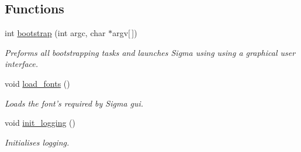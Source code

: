 \subsection*{Functions}
\begin{DoxyCompactItemize}
\item 
\hypertarget{namespacesigma_1_1gui_af29d2039a3ce3982f2f7cec59b9a4678}{int \hyperlink{namespacesigma_1_1gui_af29d2039a3ce3982f2f7cec59b9a4678}{bootstrap} (int argc, char $\ast$argv\mbox{[}$\,$\mbox{]})}\label{namespacesigma_1_1gui_af29d2039a3ce3982f2f7cec59b9a4678}

\begin{DoxyCompactList}\small\item\em Preforms all bootstrapping tasks and launches Sigma using using a graphical user interface. \end{DoxyCompactList}\item 
\hypertarget{namespacesigma_1_1gui_ac69e307732a86f3ecf06e62cf37f7715}{void \hyperlink{namespacesigma_1_1gui_ac69e307732a86f3ecf06e62cf37f7715}{load\-\_\-fonts} ()}\label{namespacesigma_1_1gui_ac69e307732a86f3ecf06e62cf37f7715}

\begin{DoxyCompactList}\small\item\em Loads the font's required by Sigma gui. \end{DoxyCompactList}\item 
\hypertarget{namespacesigma_1_1gui_a8f3a98f909e24d78a4b6d95516e787b3}{void \hyperlink{namespacesigma_1_1gui_a8f3a98f909e24d78a4b6d95516e787b3}{init\-\_\-logging} ()}\label{namespacesigma_1_1gui_a8f3a98f909e24d78a4b6d95516e787b3}

\begin{DoxyCompactList}\small\item\em Initialises logging. \end{DoxyCompactList}\end{DoxyCompactItemize}
